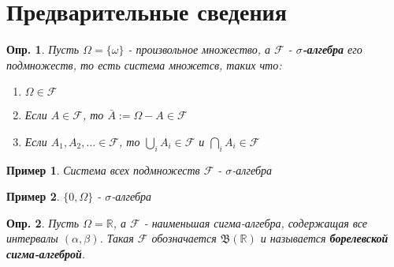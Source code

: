 \documentclass[10pt]{article}
\newtheorem{definition}{Опр.}
\newtheorem{example}{Пример}[definition]
\theoremstyle{theorem}
\newcommand\defin[1]{\textbf{#1}}
\def\R{
    \mathbb{R}
}
\def\F{
    \mathcal{F}
}
\def\B{
    \mathfrak{B}
}
\begin{document}
    
\section{Предварительные сведения}

\begin{definition}
    Пусть $\Omega = \{\omega\}$ - произвольное множество, а $\F$ - \defin{$\sigma$-алгебра} его подмножеств,
    то есть система множетсв, таких что:
    \begin{enumerate}
        \item $\Omega \in \F$
        \item Если $A \in \F$, то $\bar{A} := \Omega - A \in \F $
        \item Если $A_1, A_2, \ldots \in \F$, то $\bigcup_iA_i \in \F$ и $ \bigcap_iA_i \in \F$ 
    \end{enumerate}
\end{definition}
\begin{example}
    Система всех подмножеств $\F$ - $\sigma$-алгебра
\end{example}
\begin{example}
    $\{0, \Omega\}$ - $\sigma$-алгебра
\end{example}
\begin{definition}
    Пусть $\Omega = \R$, а $\F$ - наименьшая сигма-алгебра, содержащая все
    интервалы $(\alpha, \beta)$. Такая $\F$ обозначается $\B(\R)$ и
    называется \defin{борелевской сигма-алгеброй}.
\end{definition}
\end{document}

